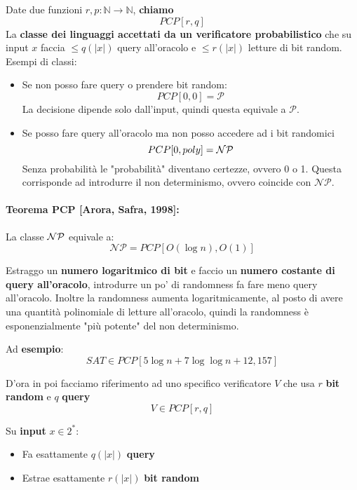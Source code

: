 Date due funzioni $r,p : \mathbb{N} \rightarrow \mathbb{N}$, \textbf{chiamo} 
$$ PCP [r,q] $$
La \textbf{classe dei linguaggi accettati da un verificatore probabilistico} che su input $x$ faccia $\leq q(|x|)$ query all'oracolo e $\leq r(|x|)$ letture di bit random.\\

Esempi di classi: 
\begin{itemize}
	\item Se non posso fare query o prendere bit random:
	$$ PCP [0,0] = \mathcal{P} $$
	La decisione dipende solo dall'input, quindi questa equivale a $\mathcal{P}$.\\
	
	\item Se posso fare query all'oracolo ma non posso accedere ad i bit randomici
	$$ PCP [0, poly] = \mathcal{NP} $$
	Senza probabilità le "probabilità" diventano certezze, ovvero 0 o 1. Questa corrisponde ad introdurre il non determinismo, ovvero coincide con $\mathcal{NP}$.\\
\end{itemize}

\paragraph{Teorema PCP [Arora, Safra, 1998]: } La classe $\mathcal{NP}$ equivale a:
$$\mathcal{NP} = PCP [O (\log n), O(1)] $$

Estraggo un \textbf{numero logaritmico di bit} e faccio un \textbf{numero costante di query all'oracolo}, introdurre un po' di randomness fa fare meno query all'oracolo. Inoltre la randomness aumenta logaritmicamente, al posto di avere una quantità polinomiale di letture all'oracolo, quindi la randomness è esponenzialmente "più potente" del non determinismo.\\

\newpage

Ad \textbf{esempio}: 
$$ SAT \in PCP [ 5 \log n + 7 \log \log n + 12, 157] $$

D'ora in poi facciamo riferimento ad uno specifico verificatore $V$ che usa $r$ \textbf{bit random} e $q$ \textbf{query}
$$ V \in PCP [r,q] $$

Su \textbf{input} $x \in 2^\ast$:
\begin{itemize}
	\item Fa esattamente $q(|x|)$ \textbf{query}
	\item Estrae esattamente $r(|x|)$ \textbf{bit random}
\end{itemize}

